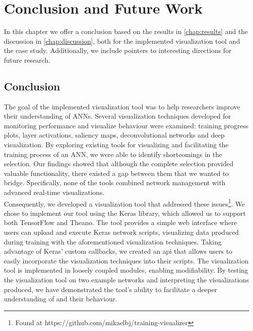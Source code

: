 
\chapter{Conclusion and Future Work}

In this chapter we offer a conclusion based on the results in \autoref{chap:results} and the discussion in \autoref{chap:discussion}, both for the implemented visualization tool and the case study. Additionally, we include pointers to interesting directions for future research.

\section{Conclusion}

The goal of the implemented visualization tool was to help researchers improve their understanding of ANNs. Several visualization techniques developed for monitoring performance and visualize behaviour were examined: training progress plots, layer activations, saliency maps, deconvolutional networks and deep visualization. By exploring existing tools for visualizing and facilitating the training process of an ANN, we were able to identify shortcomings in the selection. Our findings showed that although the complete selection provided valuable functionality, there existed a gap between them that we wanted to bridge. Specifically, none of the tools combined network management with advanced real-time visualizations. \\

\noindent Consequently, we developed a visualization tool that addressed these issues\footnote{Found at https://github.com/mikaelbj/training-visualizer}. We chose to implement our tool using the Keras library, which allowed us to support both TensorFlow and Theano. The tool provides a simple web interface where users can upload and execute Keras network scripts, visualizing data produced during training with the aforementioned visualization techniques. Taking advantage of Keras' custom callbacks, we created an \acrshort{api} that allows users to easily incorporate the visualization techniques into their scripts. The visualization tool is implemented in loosely coupled modules, enabling modifiability. By testing the visualization tool on two example networks and interpreting the visualizations produced, we have demonstrated the tool's ability to facilitate a deeper understanding of  and their behaviour. \\

